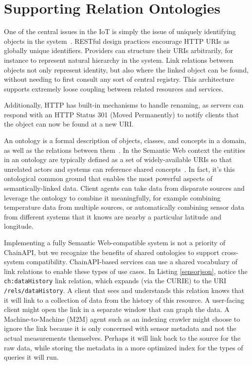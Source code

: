 \documentclass{acm_proc_article-sp}
\begin{document}
\section{Supporting Relation Ontologies}

One of the central issues in the IoT is simply the issue of uniquely
identifying objects in the system~\cite{iotsurvey}. RESTful design practices
encourage HTTP URIs as globally unique identifiers. Providers can structure
their URIs arbitrarily, for instance to represent natural hierarchy in the
system. Link relations between objects not only represent identity, but also
where the linked object can be found, without needing to first consult any sort
of central registry. This architecture supports extremely loose coupling
between related resources and services.

Additionally, HTTP has built-in mechanisms to handle renaming, as servers can
respond with an HTTP Status 301 (Moved Permanently) to notify clients that the
object can now be found at a new URI.

An ontology is a formal description of objects, classes, and concepts in a
domain, as well as the relations between them~\cite{gruber1993}. In the
Semantic Web context the entities in an ontology are typically defined as a set
of widely-available URIs so that unrelated actors and systems can reference
shared concepts~\cite{bernerslee2001semantic}. In fact, it's this ontological
common ground that enables the most powerful aspects of semantically-linked
data. Client agents can take data from disparate sources and leverage the
ontology to combine it meaningfully, for example combining temperature data
from multiple sources, or automatically combining sensor data from different
systems that it knows are nearby a particular latitude and longitude.

Implementing a fully Semantic Web-compatible system is not a priority of
ChainAPI, but we recognize the benefits of shared ontologies to support
cross-system compatibility. ChainAPI-based services can use a shared vocabulary
of link relations to enable these types of use cases. In Listing
\ref{sensorjson}, notice the \texttt{ch:dataHistory} link relation, which
expands (via the CURIE) to the URI \texttt{/rels/dataHistory}. A client that
sees and understands this relation knows that it will link to a collection of
data from the history of this resource. A user-facing client might open the
link in a separate window that can graph the data. A Machine-to-Machine (M2M)
agent such as an indexing crawler might choose to ignore the link because it is
only concerned with sensor metadata and not the actual measurements themselves.
Perhaps it will link back to the source for the raw data, while storing the
metadata in a more optimized index for the types of queries it will run.
\end{document}
